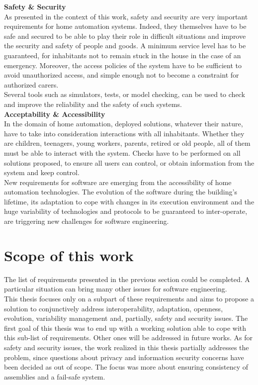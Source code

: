 {\bf Safety \& Security}\\
As presented in the context of this work, safety and security are very important requirements for home automation systems. Indeed, they themselves have to be safe and secured to be able to play their role in difficult situations and improve the security and safety of people and goods.
A minimum service level has to be guaranteed, for inhabitants not to remain stuck in the house in the case of an emergency. Moreover, the access policies of the system have to be sufficient to avoid unauthorized access, and simple enough not to become a constraint for authorized carers.\\
Several tools such as simulators, tests, or model checking, can be used to check and improve the reliability and the safety of such systems.\\

{\bf Acceptability \& Accessibility}\\
In the domain of home automation, deployed solutions, whatever their nature, have to take into consideration interactions with all inhabitants. Whether they are children, teenagers, young workers, parents, retired or old people, all of them must be able to interact with the system. 
Checks have to be performed on all solutions proposed, to ensure all users can control, or obtain information from the system and keep control.\\

New requirements for software are emerging from the accessibility of home automation technologies. The evolution of the software during the building's lifetime, its adaptation to cope with changes in its execution environment and the huge variability of technologies and protocols to be guaranteed to inter-operate, are triggering new challenges for software engineering.

\section{Scope of this work}
\label{sec:scope}
The list of requirements presented in the previous section could be completed. A particular situation can bring many other issues for software engineering.\\
This thesis focuses only on a subpart of these requirements and aims to propose a solution to conjunctively address interoperability, adaptation, openness, evolution, variability management and, partially, safety and security issues. The first goal of this thesis was to end up with a working solution able to cope with this sub-list of requirements. Other ones will be addressed in future works. As for safety and security issues, the work realized in this thesis partially addresses the problem, since questions about privacy and information security concerns have been decided as out of scope. The focus was more about ensuring consistency of assemblies and a fail-safe system.

